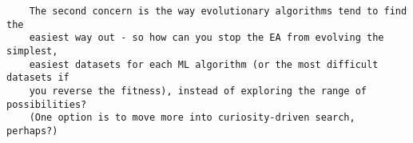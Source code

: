 \documentclass[11pt]{article}
\begin{document}


\begin{tcolorbox}
\begin{verbatim}
    The second concern is the way evolutionary algorithms tend to find the
    easiest way out - so how can you stop the EA from evolving the simplest,
    easiest datasets for each ML algorithm (or the most difficult datasets if
    you reverse the fitness), instead of exploring the range of possibilities?
    (One option is to move more into curiosity-driven search, perhaps?)
\end{verbatim}
\end{tcolorbox}


\end{document}
